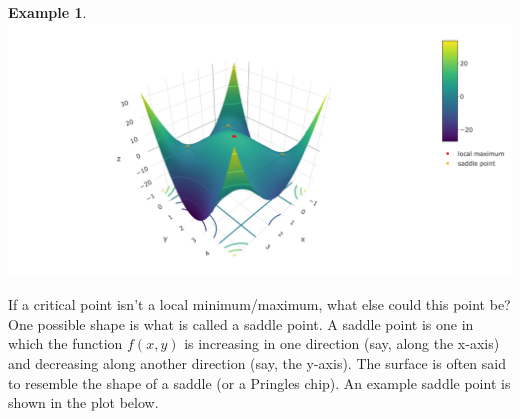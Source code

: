\documentclass[
]{book}
\theoremstyle{definition}
\theoremstyle{definition}
\newtheorem{example}{Example}[chapter]
\theoremstyle{definition}
\theoremstyle{definition}
\theoremstyle{remark}
\begin{document}
\begin{example}
\includegraphics[width=1\linewidth]{./webshot-images/critical}
\end{example}

If a critical point isn't a local minimum/maximum, what else could this point be? One possible shape is what is called a saddle point. A saddle point is one in which the function \(f(x, y)\) is increasing in one direction (say, along the x-axis) and decreasing along another direction (say, the y-axis). The surface is often said to resemble the shape of a saddle (or a Pringles chip). An example saddle point is shown in the plot below.
\end{document}
